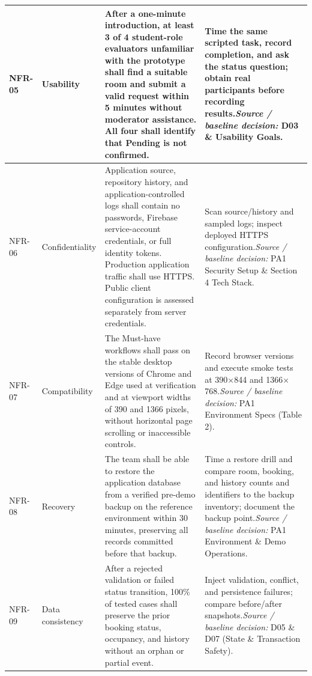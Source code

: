 \begin{longtable}{|>{\raggedright\arraybackslash}p{}|>{\raggedright\arraybackslash}p{}|>{\raggedright\arraybackslash}p{}|>{\raggedright\arraybackslash}p{}|}
NFR-05 & Usability & After a one-minute introduction, at least 3 of 4 student-role evaluators unfamiliar with the prototype shall find a suitable room and submit a valid request within 5 minutes without moderator assistance. All four shall identify that Pending is not confirmed. & Time the same scripted task, record completion, and ask the status question; obtain real participants before recording results.\newline\textit{Source / baseline decision:} D03 \& Usability Goals. \\ \hline
NFR-06 & Confidentiality & Application source, repository history, and application-controlled logs shall contain no passwords, Firebase service-account credentials, or full identity tokens. Production application traffic shall use HTTPS. Public client configuration is assessed separately from server credentials. & Scan source/history and sampled logs; inspect deployed HTTPS configuration.\newline\textit{Source / baseline decision:} PA1 Security Setup \& Section 4 Tech Stack. \\ \hline
NFR-07 & Compatibility & The Must-have workflows shall pass on the stable desktop versions of Chrome and Edge used at verification and at viewport widths of 390 and 1366 pixels, without horizontal page scrolling or inaccessible controls. & Record browser versions and execute smoke tests at 390$\times$844 and 1366$\times$768.\newline\textit{Source / baseline decision:} PA1 Environment Specs (Table 2). \\ \hline
NFR-08 & Recovery & The team shall be able to restore the application database from a verified pre-demo backup on the reference environment within 30 minutes, preserving all records committed before that backup. & Time a restore drill and compare room, booking, and history counts and identifiers to the backup inventory; document the backup point.\newline\textit{Source / baseline decision:} PA1 Environment \& Demo Operations. \\ \hline
NFR-09 & Data consistency & After a rejected validation or failed status transition, 100\% of tested cases shall preserve the prior booking status, occupancy, and history without an orphan or partial event. & Inject validation, conflict, and persistence failures; compare before/after snapshots.\newline\textit{Source / baseline decision:} D05 \& D07 (State \& Transaction Safety). \\ \hline

\end{longtable}
